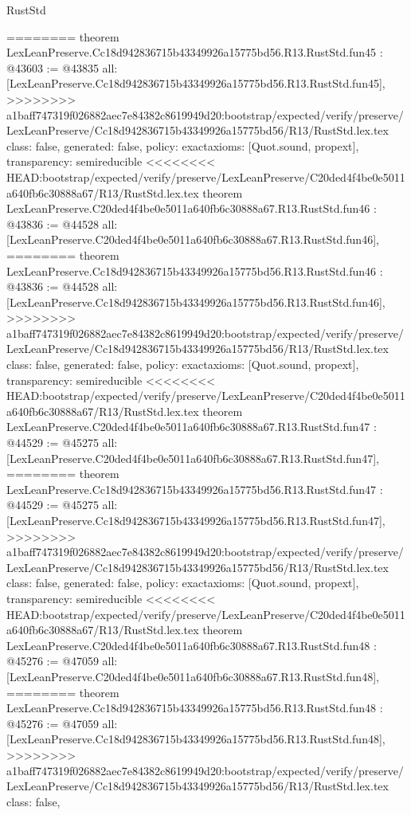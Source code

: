 \begin{lexlean}{RustStd}
\begin{coremodule}
{\begin{coremodule}
{{{{{{{{{{{{{{{{{{{{{{{{{{{{{{{{{{{{{{{{{{{{{{{{========
theorem LexLeanPreserve.Cc18d942836715b43349926a15775bd56.R13.RustStd.fun45 : @43603 := @43835 {
  all: [LexLeanPreserve.Cc18d942836715b43349926a15775bd56.R13.RustStd.fun45],
>>>>>>>> a1baff747319f026882aec7e84382c8619949d20:bootstrap/expected/verify/preserve/LexLeanPreserve/Cc18d942836715b43349926a15775bd56/R13/RustStd.lex.tex
  class: false,
  generated: false,
  policy: exact{axioms: [Quot.sound, propext]},
  transparency: semireducible
}
<<<<<<<< HEAD:bootstrap/expected/verify/preserve/LexLeanPreserve/C20ded4f4be0e5011a640fb6c30888a67/R13/RustStd.lex.tex
theorem LexLeanPreserve.C20ded4f4be0e5011a640fb6c30888a67.R13.RustStd.fun46 : @43836 := @44528 {
  all: [LexLeanPreserve.C20ded4f4be0e5011a640fb6c30888a67.R13.RustStd.fun46],
========
theorem LexLeanPreserve.Cc18d942836715b43349926a15775bd56.R13.RustStd.fun46 : @43836 := @44528 {
  all: [LexLeanPreserve.Cc18d942836715b43349926a15775bd56.R13.RustStd.fun46],
>>>>>>>> a1baff747319f026882aec7e84382c8619949d20:bootstrap/expected/verify/preserve/LexLeanPreserve/Cc18d942836715b43349926a15775bd56/R13/RustStd.lex.tex
  class: false,
  generated: false,
  policy: exact{axioms: [Quot.sound, propext]},
  transparency: semireducible
}
<<<<<<<< HEAD:bootstrap/expected/verify/preserve/LexLeanPreserve/C20ded4f4be0e5011a640fb6c30888a67/R13/RustStd.lex.tex
theorem LexLeanPreserve.C20ded4f4be0e5011a640fb6c30888a67.R13.RustStd.fun47 : @44529 := @45275 {
  all: [LexLeanPreserve.C20ded4f4be0e5011a640fb6c30888a67.R13.RustStd.fun47],
========
theorem LexLeanPreserve.Cc18d942836715b43349926a15775bd56.R13.RustStd.fun47 : @44529 := @45275 {
  all: [LexLeanPreserve.Cc18d942836715b43349926a15775bd56.R13.RustStd.fun47],
>>>>>>>> a1baff747319f026882aec7e84382c8619949d20:bootstrap/expected/verify/preserve/LexLeanPreserve/Cc18d942836715b43349926a15775bd56/R13/RustStd.lex.tex
  class: false,
  generated: false,
  policy: exact{axioms: [Quot.sound, propext]},
  transparency: semireducible
}
<<<<<<<< HEAD:bootstrap/expected/verify/preserve/LexLeanPreserve/C20ded4f4be0e5011a640fb6c30888a67/R13/RustStd.lex.tex
theorem LexLeanPreserve.C20ded4f4be0e5011a640fb6c30888a67.R13.RustStd.fun48 : @45276 := @47059 {
  all: [LexLeanPreserve.C20ded4f4be0e5011a640fb6c30888a67.R13.RustStd.fun48],
========
theorem LexLeanPreserve.Cc18d942836715b43349926a15775bd56.R13.RustStd.fun48 : @45276 := @47059 {
  all: [LexLeanPreserve.Cc18d942836715b43349926a15775bd56.R13.RustStd.fun48],
>>>>>>>> a1baff747319f026882aec7e84382c8619949d20:bootstrap/expected/verify/preserve/LexLeanPreserve/Cc18d942836715b43349926a15775bd56/R13/RustStd.lex.tex
  class: false,
}}}}}}}}}}}}}}}}}}}}}}}}}}}}}}}}}}}}}}}}}}}}}}}}}}}}
\end{coremodule}}
\end{coremodule}
\end{lexlean}
